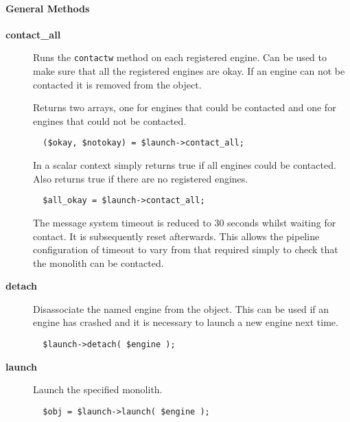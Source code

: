 \paragraph*{General Methods\label{ORAC::Msg::EngineLaunch_General_Methods}}
\begin{description}

\item[\textbf{contact\_all}] \mbox{}

Runs the \texttt{contactw} method on each registered engine. Can be used
to make sure that all the registered engines are okay.
If an engine can not be contacted it is removed from the object.



Returns two arrays, one for engines that could be contacted and
one for engines that could not be contacted.

\begin{verbatim}
  ($okay, $notokay) = $launch->contact_all;
\end{verbatim}


In a scalar context simply returns true if all engines could be
contacted. Also returns true if there are no registered engines.

\begin{verbatim}
  $all_okay = $launch->contact_all;
\end{verbatim}


The message system timeout is reduced to 30 seconds whilst
waiting for contact. It is subsequently reset afterwards. This
allows the pipeline configuration of timeout to vary from that
required simply to check that the monolith can be contacted.


\item[\textbf{detach}] \mbox{}

Disassociate the named engine from the object. This can be used
if an engine has crashed and it is necessary to launch a new
engine next time.

\begin{verbatim}
  $launch->detach( $engine );
\end{verbatim}

\item[\textbf{launch}] \mbox{}

Launch the specified monolith.

\begin{verbatim}
  $obj = $launch->launch( $engine );
\end{verbatim}



\end{description}
